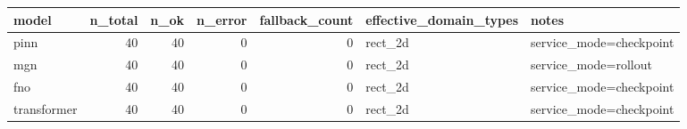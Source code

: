 \begin{tabular}{lrrrrll}
\toprule
model & n_total & n_ok & n_error & fallback_count & effective_domain_types & notes \\
\midrule
pinn & 40 & 40 & 0 & 0 & rect_2d & service_mode=checkpoint \\
mgn & 40 & 40 & 0 & 0 & rect_2d & service_mode=rollout \\
fno & 40 & 40 & 0 & 0 & rect_2d & service_mode=checkpoint \\
transformer & 40 & 40 & 0 & 0 & rect_2d & service_mode=checkpoint \\
\bottomrule
\end{tabular}
